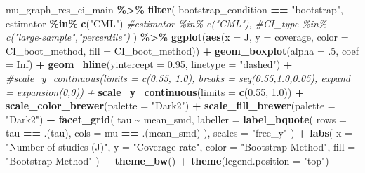 \documentclass[
]{article}
\newenvironment{Shaded}{\begin{snugshade}}{\end{snugshade}}
\newcommand{\AttributeTok}[1]{\textcolor[rgb]{0.13,0.29,0.53}{#1}}
\newcommand{\CommentTok}[1]{\textcolor[rgb]{0.56,0.35,0.01}{\textit{#1}}}
\newcommand{\ConstantTok}[1]{\textcolor[rgb]{0.56,0.35,0.01}{#1}}
\newcommand{\DecValTok}[1]{\textcolor[rgb]{0.00,0.00,0.81}{#1}}
\newcommand{\FloatTok}[1]{\textcolor[rgb]{0.00,0.00,0.81}{#1}}
\newcommand{\FunctionTok}[1]{\textcolor[rgb]{0.13,0.29,0.53}{\textbf{#1}}}
\newcommand{\NormalTok}[1]{#1}
\newcommand{\SpecialCharTok}[1]{\textcolor[rgb]{0.81,0.36,0.00}{\textbf{#1}}}
\newcommand{\StringTok}[1]{\textcolor[rgb]{0.31,0.60,0.02}{#1}}
\begin{document}
\begin{Shaded}
\begin{Highlighting}[]
\NormalTok{mu\_graph\_res\_ci\_main }\SpecialCharTok{\%\textgreater{}\%}
  \FunctionTok{filter}\NormalTok{(}
\NormalTok{    bootstrap\_condition }\SpecialCharTok{==} \StringTok{"bootstrap"}\NormalTok{,}
\NormalTok{    estimator }\SpecialCharTok{\%in\%} \FunctionTok{c}\NormalTok{(}\StringTok{"CML"}\NormalTok{)}
    \CommentTok{\#estimator \%in\% c("CML"),}
    \CommentTok{\#CI\_type \%in\% c("large{-}sample","percentile")}
\NormalTok{  ) }\SpecialCharTok{\%\textgreater{}\%}
  \FunctionTok{ggplot}\NormalTok{(}\FunctionTok{aes}\NormalTok{(}\AttributeTok{x =}\NormalTok{ J, }\AttributeTok{y =}\NormalTok{ coverage, }\AttributeTok{color =}\NormalTok{ CI\_boot\_method, }\AttributeTok{fill =}\NormalTok{ CI\_boot\_method)) }\SpecialCharTok{+}
  \FunctionTok{geom\_boxplot}\NormalTok{(}\AttributeTok{alpha =}\NormalTok{ .}\DecValTok{5}\NormalTok{, }\AttributeTok{coef =} \ConstantTok{Inf}\NormalTok{) }\SpecialCharTok{+}
  \FunctionTok{geom\_hline}\NormalTok{(}\AttributeTok{yintercept =} \FloatTok{0.95}\NormalTok{, }\AttributeTok{linetype =} \StringTok{"dashed"}\NormalTok{) }\SpecialCharTok{+}
  \CommentTok{\#scale\_y\_continuous(limits = c(0.55, 1.0), breaks = seq(0.55,1.0,0.05), expand = expansion(0,0)) +}
  \FunctionTok{scale\_y\_continuous}\NormalTok{(}\AttributeTok{limits =} \FunctionTok{c}\NormalTok{(}\FloatTok{0.55}\NormalTok{, }\FloatTok{1.0}\NormalTok{)) }\SpecialCharTok{+}
  \FunctionTok{scale\_color\_brewer}\NormalTok{(}\AttributeTok{palette =} \StringTok{"Dark2"}\NormalTok{) }\SpecialCharTok{+}
  \FunctionTok{scale\_fill\_brewer}\NormalTok{(}\AttributeTok{palette =} \StringTok{"Dark2"}\NormalTok{) }\SpecialCharTok{+}
  \FunctionTok{facet\_grid}\NormalTok{(}
\NormalTok{    tau }\SpecialCharTok{\textasciitilde{}}\NormalTok{ mean\_smd,}
    \AttributeTok{labeller =} \FunctionTok{label\_bquote}\NormalTok{(}
      \AttributeTok{rows =}\NormalTok{ tau }\SpecialCharTok{==}\NormalTok{ .(tau),}
      \AttributeTok{cols =}\NormalTok{ mu }\SpecialCharTok{==}\NormalTok{ .(mean\_smd)}
\NormalTok{    ),}
    \AttributeTok{scales =} \StringTok{"free\_y"}
\NormalTok{  ) }\SpecialCharTok{+}
  \FunctionTok{labs}\NormalTok{(}
    \AttributeTok{x =} \StringTok{"Number of studies (J)"}\NormalTok{,}
    \AttributeTok{y =} \StringTok{"Coverage rate"}\NormalTok{,}
    \AttributeTok{color =} \StringTok{"Bootstrap Method"}\NormalTok{,}
    \AttributeTok{fill =} \StringTok{"Bootstrap Method"}
\NormalTok{  ) }\SpecialCharTok{+}
  \FunctionTok{theme\_bw}\NormalTok{() }\SpecialCharTok{+}
  \FunctionTok{theme}\NormalTok{(}\AttributeTok{legend.position =} \StringTok{"top"}\NormalTok{)}
\end{Highlighting}
\end{Shaded}
\end{document}
